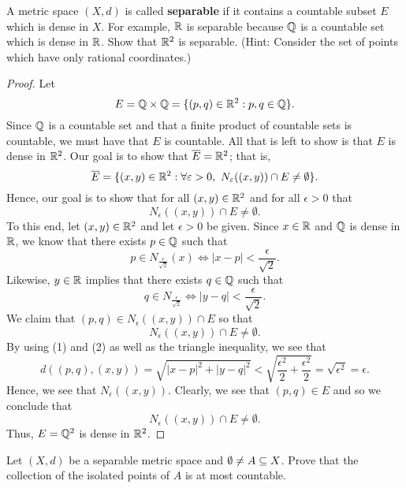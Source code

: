 \documentclass[a4paper]{article}
\begin{document}
    \begin{problem}
        A metric space \( (X,d) \) is called \textbf{separable} if it contains a countable subset \( E  \) which is dense in \( X  \). For example, \( \mathbb{R}  \) is separable because \( \mathbb{Q}  \) is a countable set which is dense in \( \mathbb{R}  \). Show that \( \mathbb{R}^{2}  \) is separable. (Hint: Consider the set of points which have only rational coordinates.) 
    \end{problem}
    \begin{proof}
        Let 
        \[  E  = \mathbb{Q} \times \mathbb{Q} = \{ (p,q) \in \mathbb{R}^{2} : p,q \in \mathbb{Q}  \}. \]
        Since \( \mathbb{Q}  \) is a countable set and that a finite product of countable sets is countable, we must have that \( E  \) is countable. All that is left to show is that \( E  \) is dense in \( \mathbb{R}^{2} \). Our goal is to show that \( \overline{E} = \mathbb{R}^{2} \); that is, 
        \[  \overline{E} = \{ (x,y) \in \mathbb{R}^{2} : \forall \varepsilon > 0, \ {N}_{\varepsilon}((x,y)) \cap E \neq \emptyset \}. \]
        Hence, our goal is to show that for all \( (x,y) \in \mathbb{R}^{2} \) and for all \( \epsilon > 0  \) that 
        \[  {N}_{\epsilon}((x,y)) \cap E \neq \emptyset. \]
        To this end, let \( (x,y) \in \mathbb{R}^{2} \) and let \( \epsilon > 0  \) be given. Since \( x \in \mathbb{R}  \) and \( \mathbb{Q}  \) is dense in \( \mathbb{R}  \), we know that there exists \( p \in \mathbb{Q}  \) such that  
        \[ p \in {N}_{\frac{ \epsilon }{ \sqrt{ 2 }  } }(x) \iff  | x - p  | < \frac{ \epsilon }{ \sqrt{ 2 }  }. \tag{1} \]
            Likewise, \( y \in \mathbb{R}  \) implies that there exists \( q \in \mathbb{Q}  \) such that 
            \[  q \in {N}_{\frac{ \epsilon }{ \sqrt{ 2 }  } } \iff | y - q  |  < \frac{ \epsilon }{ \sqrt{ 2 }  }. \tag{2} \]
            We claim that \( (p,q) \in {N}_{\epsilon}((x,y)) \cap E  \) so that 
            \[  {N}_{\epsilon}((x,y)) \cap E \neq \emptyset. \]
            By using (1) and (2) as well as the triangle inequality, we see that 
            \[  d((p,q), (x,y)) = \sqrt{ | x - p |^{2} + | y - q  |^{2} } < \sqrt{ \frac{ \epsilon^{2} }{ 2 }  + \frac{ \epsilon^{2} }{ 2 }  }  = \sqrt{ \epsilon^{2} }  = \epsilon.  \]
            Hence, we see that \( {N}_{\epsilon}((x,y)) \). Clearly, we see that \( (p,q) \in E  \) and so we conclude that 
            \[  {N}_{\epsilon}((x,y)) \cap E \neq \emptyset. \]
            Thus, \( E = \mathbb{Q}^{2} \) is dense in \( \mathbb{R}^{2} \).
    \end{proof}
   \begin{problem}
       Let \( (X,d) \) be a separable metric space and \( \emptyset \neq A \subseteq X  \). Prove that the collection of the isolated points of \( A  \) is at most countable.
   \end{problem}
\end{document}
